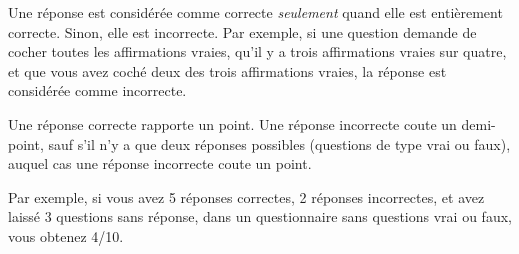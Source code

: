 \documentclass[version=last, pagesize, twoside=semi, DIV=calc, 12pt, a4paper, english, french]{scrartcl}
\begin{document}
\begin{copieexamen}[2]
\maketitle
\thispagestyle{fancy}

Une réponse est considérée comme correcte \emph{seulement} quand elle est entièrement correcte. Sinon, elle est incorrecte. Par exemple, si une question demande de cocher toutes les affirmations vraies, qu’il y a trois affirmations vraies sur quatre, et que vous avez coché deux des trois affirmations vraies, la réponse est considérée comme incorrecte.

Une réponse correcte rapporte un point. Une réponse incorrecte coute un demi-point, sauf s’il n’y a que deux réponses possibles (questions de type vrai ou faux), auquel cas une réponse incorrecte coute un point.

Par exemple, si vous avez 5 réponses correctes, 2 réponses incorrectes, et avez laissé 3 questions sans réponse, dans un questionnaire sans questions vrai ou faux, vous obtenez 4/10.

\vspace{1em}
\champnom{%
	\fbox{%
		\parbox{\dimexpr\textwidth-2\fboxsep-2\fboxrule}{%
			\vspace{1em}
			\begin{description}
				\item[Nom] \dotfill
				\item[Prénom] \vspace{1em}\dotfill
			\end{description}
		}%
	}
}
\vspace{1em}



\end{copieexamen}
\end{document}
